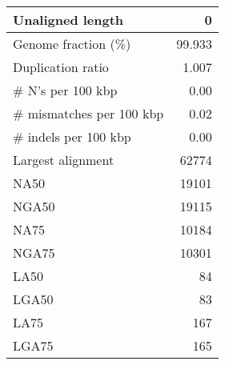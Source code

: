 \documentclass[12pt,a4paper]{article}
\begin{document}
\begin{table}[ht]
\begin{center}
\begin{tabular}{|l*{1}{|r}|}
Unaligned length & 0 \\ \hline
Genome fraction (\%) & 99.933 \\ \hline
Duplication ratio & 1.007 \\ \hline
\# N's per 100 kbp & 0.00 \\ \hline
\# mismatches per 100 kbp & 0.02 \\ \hline
\# indels per 100 kbp & 0.00 \\ \hline
Largest alignment & 62774 \\ \hline
NA50 & 19101 \\ \hline
NGA50 & 19115 \\ \hline
NA75 & 10184 \\ \hline
NGA75 & 10301 \\ \hline
LA50 & 84 \\ \hline
LGA50 & 83 \\ \hline
LA75 & 167 \\ \hline
LGA75 & 165 \\ \hline
\end{tabular}
\end{center}
\end{table}
\end{document}
